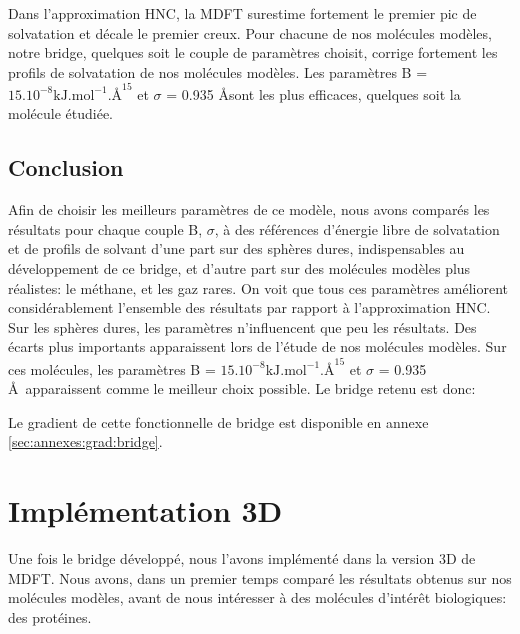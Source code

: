Dans l'approximation HNC, la MDFT surestime fortement le premier pic de solvatation et décale le premier creux. Pour chacune de nos molécules modèles, notre bridge, quelques soit le couple de paramètres choisit, corrige fortement les profils de solvatation de nos molécules modèles. Les paramètres B = $15.10^{-8} \mathrm{kJ.mol}^{-1}.\text{\AA}^{15}$ et $\sigma$ = 0.935 \AA sont les plus efficaces, quelques soit la molécule étudiée.




\subsection{Conclusion}
Afin de choisir les meilleurs paramètres de ce modèle, nous avons comparés les résultats pour chaque couple B, $\sigma$, à des références d'énergie libre de solvatation et de profils de solvant d'une part sur des sphères dures, indispensables au développement de ce bridge, et d'autre part sur des molécules modèles plus réalistes: le méthane, et les gaz rares.
On voit que tous ces paramètres améliorent considérablement l'ensemble des résultats par rapport à l'approximation HNC. Sur les sphères dures, les paramètres n'influencent que peu les résultats. Des écarts plus importants apparaissent lors de l'étude de nos molécules modèles. Sur ces molécules, les paramètres B = $15.10^{-8} \mathrm{kJ.mol}^{-1}.\text{\AA}^{15}$ et $\sigma$ = 0.935 \AA\ apparaissent comme le meilleur choix possible. Le bridge retenu est donc:


Le gradient de cette fonctionnelle de bridge est disponible en annexe \ref{sec:annexes:grad:bridge}.

\section{Implémentation 3D}
Une fois le bridge développé, nous l'avons implémenté dans la version 3D de MDFT. Nous avons, dans un premier temps comparé les résultats obtenus sur nos molécules modèles, avant de nous intéresser à des molécules d’intérêt biologiques: des protéines.


